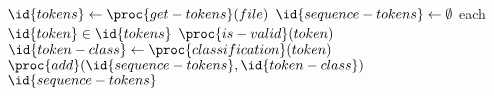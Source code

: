 \begin{codebox}
\li $\id{tokens} \gets \proc{get-tokens}(file)$
\li $\id{sequence-tokens} \gets \emptyset$
\li \For each $\id{token} \in \id{tokens}$ \Do
\li \If $\proc{is-valid}(token)$ \Then
\li $\id{token-class} \gets \proc{classification}(token)$
\li $\proc{add}(\id{sequence-tokens}, \id{token-class})$ \End \End
\li \Return $\id{sequence-tokens}$
\end{codebox}
